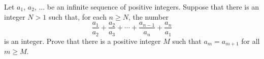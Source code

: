 Let $a_1$, $a_2$, $\ldots$ be an infinite sequence of positive integers.
Suppose that there is an integer $N > 1$ such that, for each $n \geq N$, the number
\[ \frac{a_1}{a_2} + \frac{a_2}{a_3} + \cdots + \frac{a_{n-1}}{a_n} + \frac{a_n}{a_1} \] 
is an integer.
Prove that there is a positive integer $M$ such that $a_m = a_{m+1}$ for all $m \geq M$.
